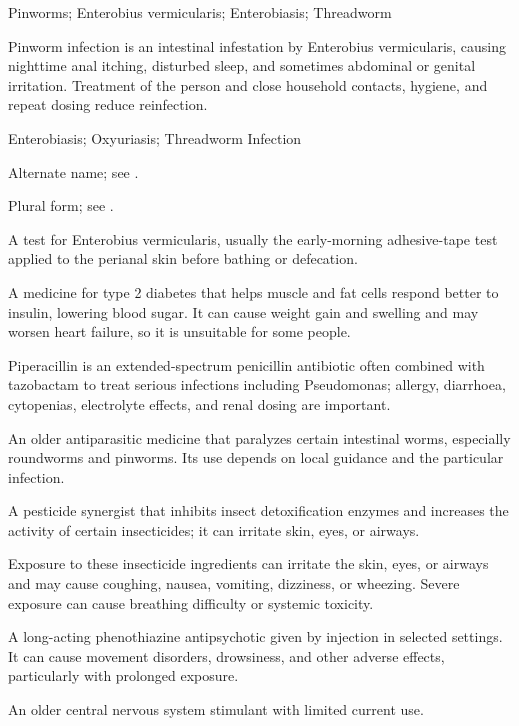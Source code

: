 \synonyms
Pinworms; Enterobius vermicularis; Enterobiasis; Threadworm

 Pinworm infection is an intestinal infestation by Enterobius vermicularis, causing nighttime anal itching, disturbed sleep, and sometimes abdominal or genital irritation. Treatment of the person and close household contacts, hygiene, and repeat dosing reduce reinfection.

\synonyms
Enterobiasis; Oxyuriasis; Threadworm Infection

 Alternate name; see .

 Plural form; see .

 A test for Enterobius vermicularis, usually the early-morning adhesive-tape test applied to the perianal skin before bathing or defecation.

 A medicine for type 2 diabetes that helps muscle and fat cells respond better to insulin, lowering blood sugar. It can cause weight gain and swelling and may worsen heart failure, so it is unsuitable for some people.

 Piperacillin is an extended-spectrum penicillin antibiotic often combined with tazobactam to treat serious infections including Pseudomonas; allergy, diarrhoea, cytopenias, electrolyte effects, and renal dosing are important.

 An older antiparasitic medicine that paralyzes certain intestinal worms, especially roundworms and pinworms. Its use depends on local guidance and the particular infection.

 A pesticide synergist that inhibits insect detoxification enzymes and increases the activity of certain insecticides; it can irritate skin, eyes, or airways.

 Exposure to these insecticide ingredients can irritate the skin, eyes, or airways and may cause coughing, nausea, vomiting, dizziness, or wheezing. Severe exposure can cause breathing difficulty or systemic toxicity.

 A long-acting phenothiazine antipsychotic given by injection in selected settings. It can cause movement disorders, drowsiness, and other adverse effects, particularly with prolonged exposure.

 An older central nervous system stimulant with limited current use.


